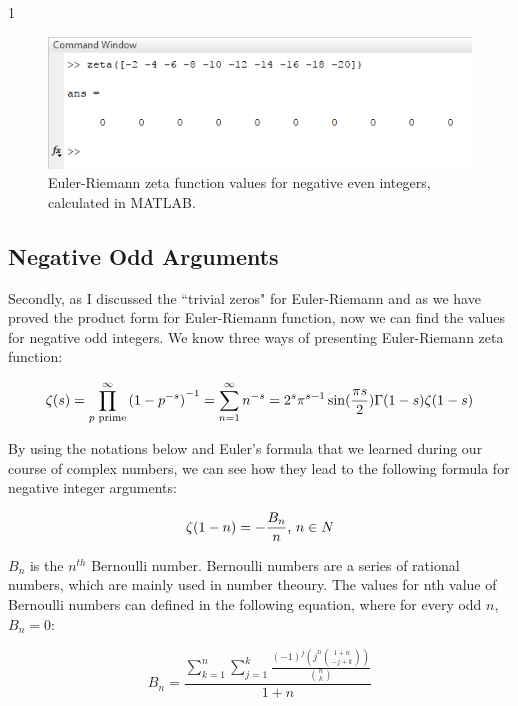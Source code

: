 1\documentclass[a4paper]{article}
\begin{document}
\begin{figure}[h!]
  \includegraphics[width=\textwidth]{zerosv.png}
\begin{center}
  \caption{Euler-Riemann zeta
function values for
negative even integers,
calculated in MATLAB.}
  \label{fig:zerosv}
\end{center}
\end{figure}

\subsection{Negative Odd Arguments}

Secondly, as I discussed the “trivial zeros" for Euler-Riemann and as we have proved the product
form for Euler-Riemann function, now we can find the values for negative odd integers. We know
three ways of presenting Euler-Riemann zeta function:

\begin{equation}
  \zeta(s)=\prod_{p \text{ prime}}^{\infty} {(1-p^{-s})}^{-1}=\sum_{n=1}^{\infty} n^{-s}=2^s\pi^{s-1}\sin(\frac{\pi s}{2})\Gamma(1-s)\zeta(1-s)\\
  \end{equation}

By using the notations below and Euler's formula that we learned during our course of complex
numbers, we can see how they lead\cite{Bern} to the following formula
for negative integer arguments:

\begin{equation}
  \label{bnn}
  \zeta(1-n)=-\frac{B_n}{n} \text{, $n\in N$}\\
  \end{equation}

$B_n$ is the $n^{th}$ Bernoulli number. Bernoulli numbers are a series of rational numbers, which are
mainly used in number theoury. The values for nth value of Bernoulli numbers can defined in the
following equation\cite{BernSeq}, where for
every odd $n$, $B_n=0$:

\begin{equation*}
  B_n=\frac{\sum_{k=1}^{n} \sum_{j=1}^{k} \frac{(-1)^j (j^n \binom{1+n}{-j+k}) }{\binom{n}{k}} }{1+n}
  \end{equation*}
\end{document}
